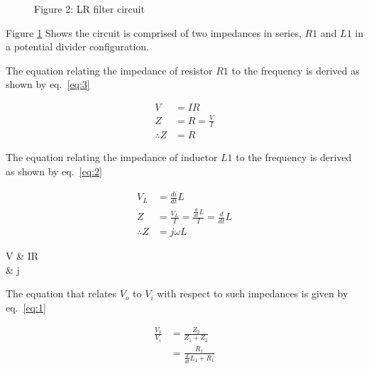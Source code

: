 

\begin{figure}[ht!]
\centering

\caption{Figure 2: LR filter circuit}\label{fig:2}
\end{figure}\FloatBarrier

Figure \ref{fig:2} Shows the circuit is comprised of two impedances in series, $R1$ and $L1$ in a potential divider configuration.

The equation  relating the impedance of resistor $R1$ to the frequency is derived as shown by eq.~\ref{eq:3}

\begin{equation}
\begin{split}
    V &= IR\\
    Z &= R = \frac{V}{I}\\
    \therefore Z &= R
\end{split}\label{eq:3}
\end{equation}

The equation relating the impedance of inductor $L1$ to the frequency is derived as shown by eq.~\ref{eq:2}

\begin{equation}
\begin{split}
    V_{L} &= \frac{di}{dt}L\\
    Z &= \frac{V_{L}}{I} = \frac{\frac{d}{dt}L}{I} = \frac{d}{dt}L\\
    \therefore Z &= j\omega L 
\end{split}
\label{eq:2}
\end{equation}

\begin{conditions}
V & IR\\
 & j\omega\\
\end{conditions}

The equation that relates $V_{o}$ to $V_{i}$ with respect to such impedances is given by eq.~\ref{eq:1}

\begin{equation}
    \begin{split}
        \frac{V_{o}}{V_{i}} &= \frac{Z_{2}}{Z_{1}+Z_{2}} \\
        &= \frac{R_{1}}{\frac{d}{dt} L_{1}+R_{1}} \\
    \end{split}
\label{eq:1}
\end{equation}

